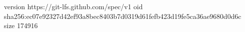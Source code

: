 version https://git-lfs.github.com/spec/v1
oid sha256:ec07e92327d42ef93a8bec8403b7d0319d61fefb423d19fe5ca36ae9680d0d6c
size 174916
